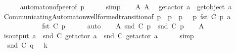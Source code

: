 \begin{isabellebody}
\ \ \ \ \isamarkupfalse%
\ automaton{\isacharunderscore}{\kern0pt}of{\isacharunderscore}{\kern0pt}peer{\isacharbrackleft}{\kern0pt}of\ p{\isacharbrackright}{\kern0pt}\isanewline
\ \ \ \ \isamarkupfalse%
\ simp\isanewline
\ \ \isamarkupfalse%
\ A{}\ A{}\ \isamarkupfalse%
\ {\isachardoublequoteopen}get{\isacharunderscore}{\kern0pt}actor\ a\ {\isasymnoteq}\ get{\isacharunderscore}{\kern0pt}object\ a{\isachardoublequoteclose}\isanewline
\ \ \ \ \isamarkupfalse%
\ CommunicatingAutomaton{\isachardot}{\kern0pt}well{\isacharunderscore}{\kern0pt}formed{\isacharunderscore}{\kern0pt}transition{\isacharbrackleft}{\kern0pt}of\ p\ {\isachardoublequoteopen}{\isasymS}\ p{\isachardoublequoteclose}\ {\isachardoublequoteopen}{\isasymI}\ p{\isachardoublequoteclose}\ {\isasymM}\ {\isachardoublequoteopen}{\isasymR}\ p{\isachardoublequoteclose}\ {\isachardoublequoteopen}fst\ {\isacharparenleft}{\kern0pt}C{}\ p{\isacharparenright}{\kern0pt}{\isachardoublequoteclose}\ a\isanewline
\ \ \ \ \ \ \ \ \ \ \ \ {\isachardoublequoteopen}fst\ {\isacharparenleft}{\kern0pt}C{}\ p{\isacharparenright}{\kern0pt}{\isachardoublequoteclose}{\isacharbrackright}{\kern0pt}\isanewline
\ \ \ \ \isamarkupfalse%
\ auto\isanewline
\ \ \isamarkupfalse%
\ A{}{\isacharcolon}{\kern0pt}\ {\isachardoublequoteopen}snd\ {\isacharparenleft}{\kern0pt}C{}\ p{\isacharparenright}{\kern0pt}\ {\isacharequal}{\kern0pt}\ snd\ {\isacharparenleft}{\kern0pt}C{}\ p{\isacharparenright}{\kern0pt}{\isachardoublequoteclose}\isanewline
\ \ \isamarkupfalse%
\ A{}\ \isamarkupfalse%
\ {\isachardoublequoteopen}is{\isacharunderscore}{\kern0pt}output\ a\ {\isasymLongrightarrow}\ snd\ {\isacharparenleft}{\kern0pt}C{}\ {\isacharparenleft}{\kern0pt}get{\isacharunderscore}{\kern0pt}actor\ a{\isacharparenright}{\kern0pt}{\isacharparenright}{\kern0pt}\ {\isacharequal}{\kern0pt}\ snd\ {\isacharparenleft}{\kern0pt}C{}\ {\isacharparenleft}{\kern0pt}get{\isacharunderscore}{\kern0pt}actor\ a{\isacharparenright}{\kern0pt}{\isacharparenright}{\kern0pt}{\isachardoublequoteclose}\isanewline
\ \ \ \ \isamarkupfalse%
\ simp\isanewline
\ \ \isamarkupfalse%
\ {\isachardoublequoteopen}{\isacharparenleft}{\kern0pt}\ {\isacharbar}{\kern0pt}snd\ {\isacharparenleft}{\kern0pt}C{}\ q{\isacharparenright}{\kern0pt}{\isacharbar}{\kern0pt}\ {\isacharparenright}{\kern0pt}\ {\isacharless}{\kern0pt}\isactrlsub {\isasymB}\ k{\isachardoublequoteclose}\isanewline

\end{isabellebody}
